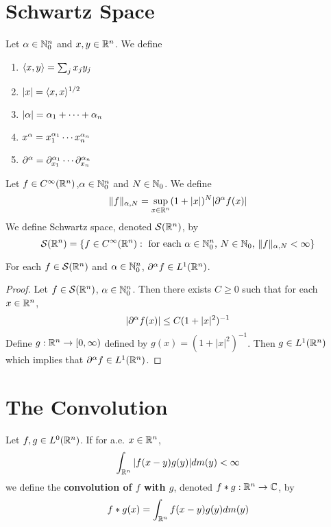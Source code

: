 \documentclass{book}
\begin{document}
	\section{Schwartz Space}
	\begin{defn}
	 Let $\alpha \in \mathbb{N}_0^n$ and $x, y \in \mathbb{R}^n$. We define 
	\begin{enumerate}
	\item $\langle x , y\rangle  = \sum_{j}x_jy_j$
	\item $|x| = \langle x, x\rangle^{1/2}$
	\item $|\alpha| = \alpha_1 + \cdots + \alpha_n$
	\item $x^\alpha = x_1^{\alpha_1}\cdots x_n^{\alpha_n}$
	\item $\partial^{\alpha} = \partial_{x_1}^{\alpha_1} \cdots \partial_{x_n}^{\alpha_n}$
	\end{enumerate}
	\end{defn}	
	
	\begin{defn}
	 Let $f \in C^{\infty}(\mathbb{R}^n)$,$\alpha \in \mathbb{N}_0^n$ and $N \in \mathbb{N}_0$. We define $$\|f\|_{\alpha, N} = \sup_{x \in \mathbb{R}^n} (1 + |x|)^N |\partial^{\alpha}f (x) |$$
	We define Schwartz space, denoted $\mathcal{S}(\mathbb{R}^n)$, by $$\mathcal{S}(\mathbb{R}^n) = \{f \in C^{\infty}(\mathbb{R}^n): \text{ for each $\alpha \in \mathbb{N}_0^n$, $N \in \mathbb{N}_0$, } \|f\|_{\alpha, N} < \infty\}$$
	\end{defn}
	
	\begin{ex}
	 For each $f \in \mathcal{S}(\mathbb{R}^n)$ and $\alpha \in \mathbb{N}_0^n$, $\partial^\alpha f \in L^1(\mathbb{R}^n)$.
	\end{ex}
	
	\begin{proof}
	Let $f \in \mathcal{S}(\mathbb{R}^n)$, $\alpha \in \mathbb{N}_0^n$. Then there exists $C \geq 0$ such that for each $x \in \mathbb{R}^n$, $$| \partial^{\alpha} f(x)| \leq C(1+|x|^{2})^{-1}$$
	Define $g:\mathbb{R}^n \rightarrow [0,\infty)$ defined by $g(x) = (1+|x|^{2})^{-1}$. Then $g \in L^1(\mathbb{R}^n)$ which implies that $\partial^{\alpha} f \in L^1(\mathbb{R}^n)$.
	\end{proof}
	
	\begin{defn}
	
	\end{defn}
	
	
	
	
	
	
	
	
	
	
	
	\newpage
	\section{The Convolution}
	\begin{defn}
	Let $f, g \in L^0(\mathbb{R}^n)$. If for a.e. $x \in \mathbb{R}^n$, $$\int_{\mathbb{R}^n} |f(x-y)g(y)| dm(y) < \infty$$  
	we define the \textbf{convolution of $f$ with $g$}, denoted $f * g: \mathbb{R}^n \rightarrow \mathbb{C}$, by $$ f * g(x) = \int_{\mathbb{R}^n} f(x-y)g(y) dm(y)$$
	\end{defn}
	
\end{document}
